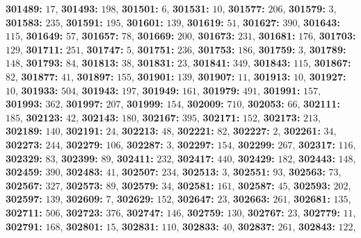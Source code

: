 \textsf{\bfseries 301489:} $17$, \textsf{\bfseries 301493:} $198$, \textsf{\bfseries 301501:} $6$, \textsf{\bfseries 301531:} $10$, \textsf{\bfseries 301577:} $206$, \textsf{\bfseries 301579:} $3$, \textsf{\bfseries 301583:} $235$, \textsf{\bfseries 301591:} $195$, \textsf{\bfseries 301601:} $139$, \textsf{\bfseries 301619:} $51$, \textsf{\bfseries 301627:} $390$, \textsf{\bfseries 301643:} $115$, \textsf{\bfseries 301649:} $57$, \textsf{\bfseries 301657:} $78$, \textsf{\bfseries 301669:} $200$, \textsf{\bfseries 301673:} $231$, \textsf{\bfseries 301681:} $176$, \textsf{\bfseries 301703:} $129$, \textsf{\bfseries 301711:} $251$, \textsf{\bfseries 301747:} $5$, \textsf{\bfseries 301751:} $236$, \textsf{\bfseries 301753:} $186$, \textsf{\bfseries 301759:} $3$, \textsf{\bfseries 301789:} $148$, \textsf{\bfseries 301793:} $84$, \textsf{\bfseries 301813:} $38$, \textsf{\bfseries 301831:} $23$, \textsf{\bfseries 301841:} $349$, \textsf{\bfseries 301843:} $115$, \textsf{\bfseries 301867:} $82$, \textsf{\bfseries 301877:} $41$, \textsf{\bfseries 301897:} $155$, \textsf{\bfseries 301901:} $139$, \textsf{\bfseries 301907:} $11$, \textsf{\bfseries 301913:} $10$, \textsf{\bfseries 301927:} $10$, \textsf{\bfseries 301933:} $504$, \textsf{\bfseries 301943:} $197$, \textsf{\bfseries 301949:} $161$, \textsf{\bfseries 301979:} $491$, \textsf{\bfseries 301991:} $157$, \textsf{\bfseries 301993:} $362$, \textsf{\bfseries 301997:} $207$, \textsf{\bfseries 301999:} $154$, \textsf{\bfseries 302009:} $710$, \textsf{\bfseries 302053:} $66$, \textsf{\bfseries 302111:} $185$, \textsf{\bfseries 302123:} $42$, \textsf{\bfseries 302143:} $180$, \textsf{\bfseries 302167:} $395$, \textsf{\bfseries 302171:} $152$, \textsf{\bfseries 302173:} $213$, \textsf{\bfseries 302189:} $140$, \textsf{\bfseries 302191:} $24$, \textsf{\bfseries 302213:} $48$, \textsf{\bfseries 302221:} $82$, \textsf{\bfseries 302227:} $2$, \textsf{\bfseries 302261:} $34$, \textsf{\bfseries 302273:} $244$, \textsf{\bfseries 302279:} $106$, \textsf{\bfseries 302287:} $3$, \textsf{\bfseries 302297:} $154$, \textsf{\bfseries 302299:} $267$, \textsf{\bfseries 302317:} $116$, \textsf{\bfseries 302329:} $83$, \textsf{\bfseries 302399:} $89$, \textsf{\bfseries 302411:} $232$, \textsf{\bfseries 302417:} $440$, \textsf{\bfseries 302429:} $182$, \textsf{\bfseries 302443:} $148$, \textsf{\bfseries 302459:} $390$, \textsf{\bfseries 302483:} $41$, \textsf{\bfseries 302507:} $234$, \textsf{\bfseries 302513:} $3$, \textsf{\bfseries 302551:} $93$, \textsf{\bfseries 302563:} $73$, \textsf{\bfseries 302567:} $327$, \textsf{\bfseries 302573:} $89$, \textsf{\bfseries 302579:} $34$, \textsf{\bfseries 302581:} $161$, \textsf{\bfseries 302587:} $45$, \textsf{\bfseries 302593:} $202$, \textsf{\bfseries 302597:} $139$, \textsf{\bfseries 302609:} $7$, \textsf{\bfseries 302629:} $152$, \textsf{\bfseries 302647:} $23$, \textsf{\bfseries 302663:} $261$, \textsf{\bfseries 302681:} $135$, \textsf{\bfseries 302711:} $506$, \textsf{\bfseries 302723:} $376$, \textsf{\bfseries 302747:} $146$, \textsf{\bfseries 302759:} $130$, \textsf{\bfseries 302767:} $23$, \textsf{\bfseries 302779:} $11$, \textsf{\bfseries 302791:} $168$, \textsf{\bfseries 302801:} $15$, \textsf{\bfseries 302831:} $110$, \textsf{\bfseries 302833:} $40$, \textsf{\bfseries 302837:} $261$, \textsf{\bfseries 302843:} $122$, 
